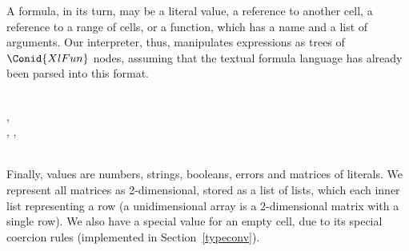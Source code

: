 A formula, in its turn, may be a literal value, a reference to another cell, a
reference to a range of cells, or a function, which has a name and a list of
arguments. Our interpreter, thus, manipulates expressions as trees of \ensuremath{\Conid{XlFun}}
nodes, assuming that the textual formula language has already been parsed into
this format.

\begin{hscode}\SaveRestoreHook
{}%
%
%
%
%
%
%
\>[B]{}\;\<[17]%
\>[17]{}\mathrel{=}{}\<[17E]%
\>[20]{}\;{}\<[27]%
\>[27]{}\<[E]%
\\
\>[17]{}\mid {}\<[17E]%
\>[20]{}\;{}\<[27]%
\>[27]{}\llparenthesis \cdot , \cdot \rrparenthesis {}\<[E]%
\\
\>[17]{}\mid {}\<[17E]%
\>[20]{}\;{}\<[27]%
\>[27]{}\llparenthesis \cdot , \cdot \rrparenthesis \;\llparenthesis \cdot , \cdot \rrparenthesis {}\<[E]%
\\
\>[17]{}\mid {}\<[17E]%
\>[20]{}\;{}\<[27]%
\>[27]{}\<[E]%
\\
\>[B]{}\<[4]%
\>[4]{}\;\<[E]%
\ColumnHook
\end{hscode}\resethooks

Finally, values are numbers, strings, booleans, errors and matrices of
literals. We represent all matrices as 2-dimensional, stored as a list of
lists, which each inner list representing a row (a unidimensional array is a
2-dimensional matrix with a single row). We also have a special value
for an empty cell, due to its special coercion rules (implemented in
Section~\ref{typeconv}).

